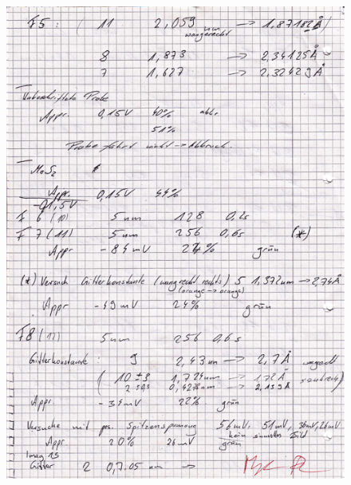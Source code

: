 \begin{appendix}
\begin{figure}[H]
\centering \includegraphics[width=\textwidth]{Bilder/Protokoll/004.png}
\end{figure}
 
 
\end{appendix}
